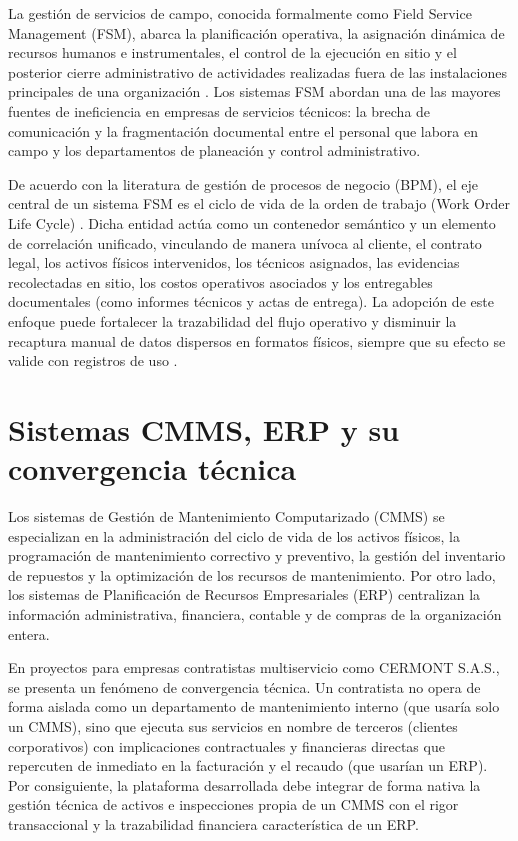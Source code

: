 La gestión de servicios de campo, conocida formalmente como Field Service Management (FSM), abarca la planificación operativa, la asignación dinámica de recursos humanos e instrumentales, el control de la ejecución en sitio y el posterior cierre administrativo de actividades realizadas fuera de las instalaciones principales de una organización \cite{gartner2024}. Los sistemas FSM abordan una de las mayores fuentes de ineficiencia en empresas de servicios técnicos: la brecha de comunicación y la fragmentación documental entre el personal que labora en campo y los departamentos de planeación y control administrativo.

De acuerdo con la literatura de gestión de procesos de negocio (BPM), el eje central de un sistema FSM es el ciclo de vida de la orden de trabajo (Work Order Life Cycle) \cite{dumas2018}. Dicha entidad actúa como un contenedor semántico y un elemento de correlación unificado, vinculando de manera unívoca al cliente, el contrato legal, los activos físicos intervenidos, los técnicos asignados, las evidencias recolectadas en sitio, los costos operativos asociados y los entregables documentales (como informes técnicos y actas de entrega). La adopción de este enfoque puede fortalecer la trazabilidad del flujo operativo y disminuir la recaptura manual de datos dispersos en formatos físicos, siempre que su efecto se valide con registros de uso \cite{fieldaware2023}.

\section{Sistemas CMMS, ERP y su convergencia técnica}

Los sistemas de Gestión de Mantenimiento Computarizado (CMMS) se especializan en la administración del ciclo de vida de los activos físicos, la programación de mantenimiento correctivo y preventivo, la gestión del inventario de repuestos y la optimización de los recursos de mantenimiento. Por otro lado, los sistemas de Planificación de Recursos Empresariales (ERP) centralizan la información administrativa, financiera, contable y de compras de la organización entera. 

En proyectos para empresas contratistas multiservicio como CERMONT S.A.S., se presenta un fenómeno de convergencia técnica. Un contratista no opera de forma aislada como un departamento de mantenimiento interno (que usaría solo un CMMS), sino que ejecuta sus servicios en nombre de terceros (clientes corporativos) con implicaciones contractuales y financieras directas que repercuten de inmediato en la facturación y el recaudo (que usarían un ERP). Por consiguiente, la plataforma desarrollada debe integrar de forma nativa la gestión técnica de activos e inspecciones propia de un CMMS con el rigor transaccional y la trazabilidad financiera característica de un ERP.

